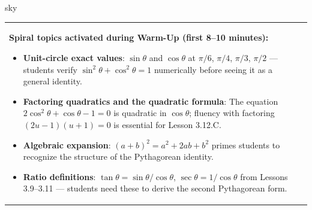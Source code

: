 \documentclass[10pt]{article}
\begin{document}
\begin{skillbox}{sky}
\begin{tabularx}{\linewidth}{@{}X c@{}}
\begin{minipage}[t]{0.96\linewidth}\vspace{0pt}
\textbf{Spiral topics activated during Warm-Up (first 8--10 minutes):}
\begin{itemize}[leftmargin=1.4em, itemsep=2pt]
  \item \textbf{Unit-circle exact values}: $\sin\theta$ and $\cos\theta$ at
    $\pi/6$, $\pi/4$, $\pi/3$, $\pi/2$ --- students verify $\sin^2\theta + \cos^2\theta = 1$
    numerically before seeing it as a general identity.
  \item \textbf{Factoring quadratics and the quadratic formula}: The equation
    $2\cos^2\theta + \cos\theta - 1 = 0$ is quadratic in $\cos\theta$; fluency
    with factoring $(2u - 1)(u + 1) = 0$ is essential for Lesson 3.12.C.
  \item \textbf{Algebraic expansion}: $(a+b)^2 = a^2 + 2ab + b^2$ primes
    students to recognize the structure of the Pythagorean identity.
  \item \textbf{Ratio definitions}: $\tan\theta = \sin\theta / \cos\theta$,
    $\sec\theta = 1/\cos\theta$ from Lessons 3.9--3.11 --- students need these
    to derive the second Pythagorean form.
\end{itemize}
\end{minipage}
&
\end{tabularx}
\end{skillbox}

\vspace{0.08in}
\end{document}
